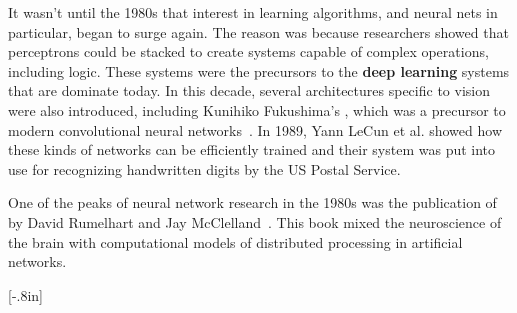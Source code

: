 It wasn't until the 1980s that interest in learning algorithms, and neural nets in particular, began to surge again. The reason was because researchers showed that perceptrons could be stacked to create systems capable of complex operations, including logic. These systems were the precursors to the {\bf deep learning} systems that are dominate today. In this decade, several architectures specific to vision were also introduced, including Kunihiko Fukushima's , which was a precursor to modern convolutional neural networks~\cite{fukushima1980neocognitron}. In 1989, Yann LeCun et al. showed how these kinds of networks can be efficiently trained \cite{lecun1989backpropagation} and their system was put into use for recognizing handwritten digits by the US Postal Service.


One of the peaks of neural network research in the 1980s was the publication of  by David Rumelhart and Jay McClelland~\cite{Rumelhart86}. This book mixed the neuroscience of the brain with computational models of distributed processing in artificial networks.

[-.8in]

